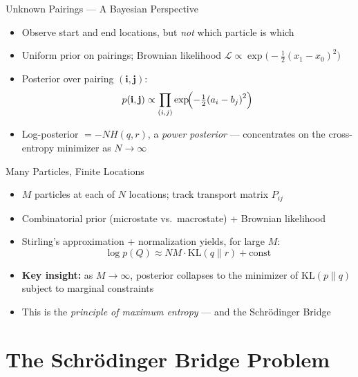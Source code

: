 \documentclass{beamer}
\newcommand{\KL}{\mathrm{KL}}
\begin{document}
\begin{frame}{Unknown Pairings — A Bayesian Perspective}
  \begin{itemize}
    \item Observe start and end locations, but \emph{not} which particle is which
    \item Uniform prior on pairings; Brownian likelihood $\mathcal{L} \propto \exp\!\bigl(-\tfrac{1}{2}{(x_1 - x_0)}^2\bigr)$
    \item Posterior over pairing $(\mathbf{i}, \mathbf{j})$:
    \[
      p(\mathbf{i},\mathbf{j}) \propto \prod_{(i,j)} \exp\!\Bigl(-\tfrac{1}{2}{(a_i - b_j)}^2\Bigr)
    \]
    \item Log-posterior $= -N H(q, r)$, a \emph{power posterior} — concentrates on the cross-entropy minimizer as $N \to \infty$
  \end{itemize}
\end{frame}

\begin{frame}{Many Particles, Finite Locations}
  \begin{itemize}
    \item $M$ particles at each of $N$ locations; track transport matrix $P_{ij}$
    \item Combinatorial prior (microstate vs.\ macrostate) + Brownian likelihood
    \item Stirling's approximation + normalization yields, for large $M$:
    \[
      \log p(Q) \approx NM\cdot \KL(q \| r) + \text{const}
    \]
    \item \textbf{Key insight:} as $M \to \infty$, posterior collapses to the minimizer of $\KL(p \| q)$ subject to marginal constraints
    \item This is the \emph{principle of maximum entropy} — and the Schrödinger Bridge
  \end{itemize}
\end{frame}

\section{The Schrödinger Bridge Problem}
\end{document}
